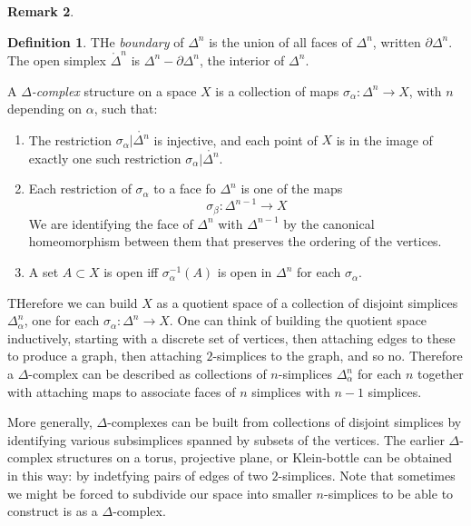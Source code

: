 \documentclass[11pt,a4paper]{article}
\theoremstyle{definition}
\newtheorem{definition}{Definition}[section]
\newtheorem{remark}[definition]{Remark}
\theoremstyle{plain}
\theoremstyle{remark}
\begin{document}
\begin{remark}
\begin{definition}
  THe \emph{boundary} of $\Delta^n$ is the union of all faces of $\Delta^n$, written $\partial \Delta^n$. 
  The open simplex $\mathring{\Delta}^n$ is $\Delta^n - \partial \Delta^n$, the interior of $\Delta^n$.
\end{definition}

A \emph{$\Delta$-complex} structure on a space $X$ is a collection of maps $\sigma_\alpha \colon \Delta^n \to X$, 
with $n$ depending on $\alpha$, such that: 
\begin{enumerate}[label = (\roman*)]
  \item The restriction $\sigma_\alpha | \mathring{\Delta^n}$ is injective, and each 
  point of $X$ is in the image of exactly one such restriction $\sigma_\alpha | \mathring{\Delta^n}$.

  \item Each restriction of $\sigma_\alpha$ to a face fo $\Delta^n$ is one of the maps 
  $$\sigma_\beta \colon \Delta^{n-1} \to X$$
  We are identifying the face of $\Delta^n$ with $\Delta^{n-1}$ by the canonical homeomorphism between 
  them that preserves the ordering of the vertices. 

  \item A set $A \subset X$ is open iff $\sigma_\alpha^{-1} (A)$ is open in $\Delta^n$ 
  for each $\sigma_\alpha$.
\end{enumerate}

THerefore we can build $X$ as a quotient space of a collection of disjoint simplices 
$\Delta^n_\alpha$, one for each $\sigma_\alpha \colon \Delta^n \to X$. One can think of 
building the quotient space inductively, starting with a discrete set of vertices, then 
attaching edges to these to produce a graph, then attaching $2$-simplices to the graph, and 
so no. Therefore a $\Delta$-complex can be described as collections of $n$-simplices $\Delta_\alpha^n$
for each $n$ together with attaching maps to associate faces of $n$ simplices with $n-1$ simplices. 

More generally, $\Delta$-complexes can be built from collections of disjoint simplices by identifying 
various subsimplices spanned by subsets of the vertices. 
The earlier $\Delta$-complex structures on a torus, projective plane, or Klein-bottle can be obtained 
in this way: by indetfying pairs of edges of two $2$-simplices. 
Note that sometimes we might be forced to subdivide our space into smaller $n$-simplices to be able to 
construct is as a $\Delta$-complex. 


\end{remark}
\end{document}
